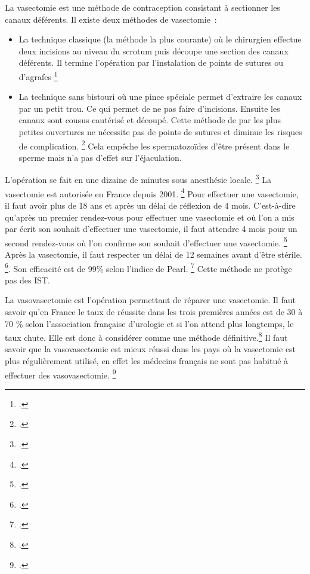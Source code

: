 \documentclass[12pt,a4paper]{report}
\begin{document}
La vasectomie est une méthode de contraception consistant à sectionner les canaux déférents. Il existe deux méthodes de vasectomie :
\begin{itemize}
    \item La technique classique (la méthode la plus courante) où le chirurgien effectue deux incisions au niveau du scrotum puis découpe une section des canaux déférents. Il termine l'opération par l'instalation de points de sutures ou d'agrafes \footcites{VasectomieToutSavoir2017}{guillaumedaudinContraceptesEnqueteDernier2022}
    \item La technique sans bistouri où une pince spéciale permet d'extraire les canaux par un petit trou. Ce qui permet de ne pas faire d'incisions. Ensuite les canaux sont cousus cautérisé et découpé. Cette méthode de par les plus petites ouvertures ne nécessite pas de points de sutures et diminue les risques de complication. \footcites{VasectomieToutSavoir2017}{guillaumedaudinContraceptesEnqueteDernier2022} Cela empêche les spermatozoïdes d'être présent dans le sperme mais n'a pas d'effet sur l'éjaculation.
\end{itemize}
L'opération se fait en une dizaine de minutes sous anesthésie locale. \footcite{VasectomieEstelleReversible}
La vasectomie est autorisée en France depuis 2001. \footcite{guillaumedaudinContraceptesEnqueteDernier2022} Pour effectuer une vasectomie, il faut avoir plus de 18 ans et après un délai de réflexion de 4 mois. C'est-à-dire qu'après un premier rendez-vous pour effectuer une vasectomie et où l'on a mis par écrit son souhait d'effectuer une vasectomie, il faut attendre 4 mois pour un second rendez-vous où l'on confirme son souhait d'effectuer une vasectomie. \footcite{SterilisationViseeContraceptive}
Après la vasectomie, il faut respecter un délai de 12 semaines avant d'être stérile. \footcite{associationfrancaisedurologieVasectomieContraceptive2012}. Son efficacité est de 99\% selon l'indice de Pearl. \footcite{EfficaciteMoyensContraceptifs}
Cette méthode ne protège pas des IST.

La vasovasectomie est l'opération permettant de réparer une vasectomie. Il faut savoir qu'en France le taux de réussite dans les trois premières années est de 30 à 70 \% selon l'association française d'urologie et si l'on attend plus longtemps, le taux chute. Elle est donc à considérer comme une méthode définitive.\footcite{VasectomieEstelleReversible}
Il faut savoir que la vasovasectomie est mieux réussi dans les pays où la vasectomie est plus régulièrement utilisé, en effet les médecins français ne sont pas habitué à effectuer des vasovasectomie. \footcite{guillaumedaudinContraceptesEnqueteDernier2022}
\end{document}
